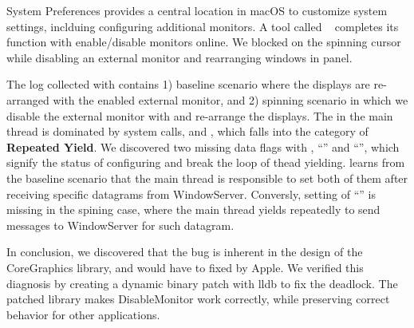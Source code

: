 System Preferences provides a central location in macOS to customize
system settings, inclduing configuring additional monitors. A tool called
~\cite{disablemonitor} completes its function with
enable/disable monitors online. We blocked on the spinning cursor while
disabling an external monitor and rearranging windows in  panel.

The log collected with \xxx contains 1) baseline scenario where the displays
are re-arranged with the enabled external monitor, and 2) spinning scenario in
which we disable the external monitor with  and re-arrange
the displays. The \spinningnode in the main thread is dominated by system
calls,  and , which falls into the category of
\textbf{Repeated Yield}. We discovered two missing data flags with ,
``'' and ``'', which
signify the status of configuring and break the loop of thead yielding. \xxx
learns from the baseline scenario that the main thread is responsible to set
both of them after receiving specific datagrams from WindowServer. Conversly,
setting of ``'' is missing in the spining case,
where the main thread yields repeatedly to send messages to WindowServer for
such datagram.

In conclusion, we discovered that the bug is inherent in the design of the
CoreGraphics library, and would have to fixed by Apple. We verified this
diagnosis by creating a dynamic binary patch with lldb to fix the deadlock. The
patched library makes DisableMonitor work correctly, while preserving correct
behavior for other applications.

